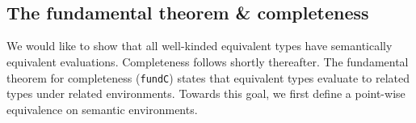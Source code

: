 \documentclass[authoryear, acmsmall, screen, review, nonacm]{acmart}
\begin{document}
\begin{code}%
\>[0]%
\>[11]\AgdaSymbol{:}\AgdaSpace{}%
\AgdaSpace{}%
\AgdaSymbol{\{}\AgdaSpace{}%
\AgdaSpace{}%
\AgdaSymbol{:}\AgdaSpace{}%
\AgdaSpace{}%
\AgdaSpace{}%
\AgdaSymbol{\}}\AgdaSpace{}%
\AgdaSpace{}%
\AgdaSpace{}%
\AgdaSpace{}%
\AgdaSpace{}%
\AgdaSpace{}%
\AgdaSpace{}%
\AgdaSpace{}%
\AgdaSpace{}%
\AgdaSpace{}%
\<%
\\
\>[0]%
\>[11]\AgdaSymbol{:}\AgdaSpace{}%
\AgdaSpace{}%
\AgdaSymbol{\{}\AgdaSpace{}%
\AgdaSpace{}%
\AgdaSymbol{:}\AgdaSpace{}%
\AgdaSpace{}%
\AgdaSpace{}%
\AgdaSymbol{\}}%
\>[41]\AgdaSpace{}%
\AgdaSpace{}%
\AgdaSpace{}%
\AgdaSpace{}%
\AgdaSpace{}%
\AgdaSpace{}%
%
\>[64]\AgdaSpace{}%
\AgdaSpace{}%
\<%
\end{code}
\begin{code}[hide]%
\>[0]\AgdaSpace{}%
\AgdaSymbol{=}\AgdaSpace{}%
\AgdaSpace{}%
\AgdaSymbol{\AgdaUnderscore{}}\<%
\\
\>[0]\AgdaSpace{}%
\AgdaSymbol{=}\AgdaSpace{}%
\AgdaSpace{}%
\AgdaSymbol{\AgdaUnderscore{}}\<%
\end{code}


\subsection{The fundamental theorem \& completeness}

We would like to show that all well-kinded equivalent types have semantically equivalent evaluations. Completeness follows shortly thereafter. The fundamental theorem for completeness (\verb!fundC!) states that equivalent types evaluate to related types under related environments. Towards this goal, we first define a point-wise equivalence on semantic environments.
\end{document}
